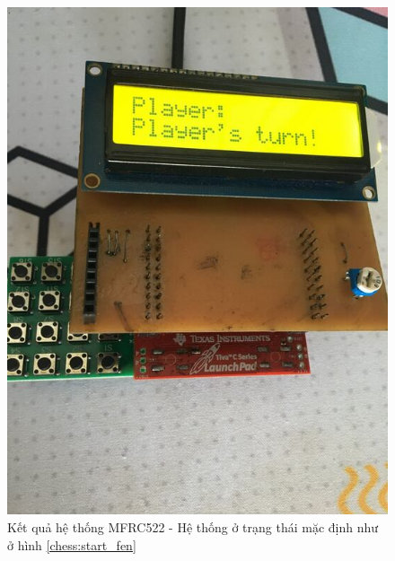 \begin{figure}[ht]
\centering
\includegraphics[scale=0.3]{images/chess_init.jpg}
\caption{Kết quả hệ thống MFRC522 - Hệ thống ở trạng thái mặc định như ở hình \ref{chess:start_fen}}
\label{fig:chess_init}
\end{figure}

